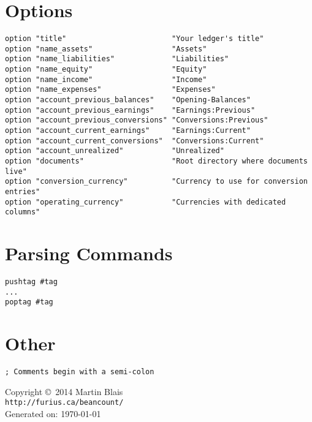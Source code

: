 \documentclass[10pt,landscape]{article}
\begin{document}
\begin{multicols}{2}
\section{Options}
\begin{verbatim}
option "title"                        "Your ledger's title"
option "name_assets"                  "Assets"
option "name_liabilities"             "Liabilities"
option "name_equity"                  "Equity"
option "name_income"                  "Income"
option "name_expenses"                "Expenses"
option "account_previous_balances"    "Opening-Balances"
option "account_previous_earnings"    "Earnings:Previous"
option "account_previous_conversions" "Conversions:Previous"
option "account_current_earnings"     "Earnings:Current"
option "account_current_conversions"  "Conversions:Current"
option "account_unrealized"           "Unrealized"
option "documents"                    "Root directory where documents live"
option "conversion_currency"          "Currency to use for conversion entries"
option "operating_currency"           "Currencies with dedicated columns"
\end{verbatim}



\section{Parsing Commands}
\begin{verbatim}
pushtag #tag
...
poptag #tag
\end{verbatim}



\section{Other}
\begin{verbatim}
; Comments begin with a semi-colon
\end{verbatim}



\scriptsize
\begin{center}
  Copyright \copyright\ 2014 Martin Blais \\
  \texttt{http://furius.ca/beancount/} \\
  Generated on: \today
\end{center}
\end{multicols}
\end{document}
